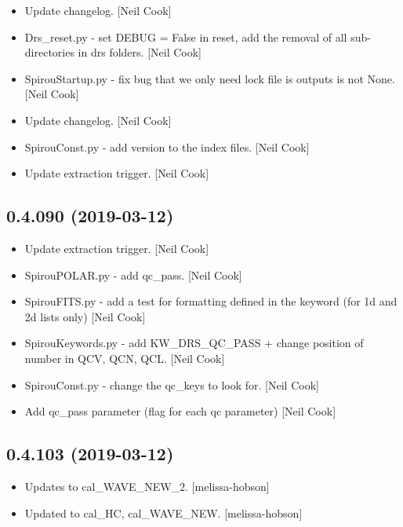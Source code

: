 \documentclass[a4paper,10pt,english]{report}
\begin{document}
\begin{itemize}
\item {} 
Update changelog. {[}Neil Cook{]}

\item {} 
Drs\_reset.py - set DEBUG = False in reset, add the removal of all sub-
directories in drs folders. {[}Neil Cook{]}

\item {} 
SpirouStartup.py - fix bug that we only need lock file is outputs is
not None. {[}Neil Cook{]}

\item {} 
Update changelog. {[}Neil Cook{]}

\item {} 
SpirouConst.py - add version to the index files. {[}Neil Cook{]}

\item {} 
Update extraction trigger. {[}Neil Cook{]}

\end{itemize}


\subsection{0.4.090 (2019-03-12)}
\label{\detokenize{misc/changelog:id168}}\begin{itemize}
\item {} 
Update extraction trigger. {[}Neil Cook{]}

\item {} 
SpirouPOLAR.py - add qc\_pass. {[}Neil Cook{]}

\item {} 
SpirouFITS.py - add a test for formatting defined in the keyword (for
1d and 2d lists only) {[}Neil Cook{]}

\item {} 
SpirouKeywords.py - add KW\_DRS\_QC\_PASS + change position of number in
QCV, QCN, QCL. {[}Neil Cook{]}

\item {} 
SpirouConst.py - change the qc\_keys to look for. {[}Neil Cook{]}

\item {} 
Add qc\_pass parameter (flag for each qc parameter) {[}Neil Cook{]}

\end{itemize}


\subsection{0.4.103 (2019-03-12)}
\label{\detokenize{misc/changelog:id169}}\begin{itemize}
\item {} 
Updates to cal\_WAVE\_NEW\_2. {[}melissa-hobson{]}

\item {} 
Updated to cal\_HC, cal\_WAVE\_NEW. {[}melissa-hobson{]}

\end{itemize}
\end{document}
